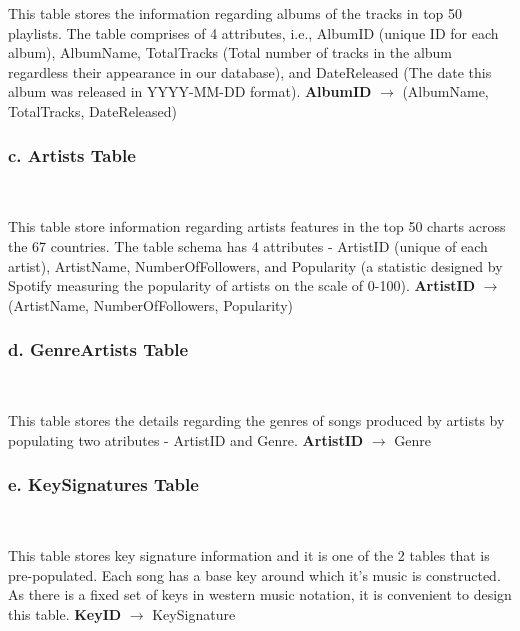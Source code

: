 \documentclass[conference]{IEEEtran}
\begin{document}
This table stores the information regarding albums of the tracks in top 50 playlists. The table comprises of 4 attributes, i.e., AlbumID (unique ID for each album), AlbumName, TotalTracks (Total number of tracks in the album regardless their appearance in our database), and DateReleased (The date this album was released in YYYY-MM-DD format). \linebreak \linebreak
\textbf{AlbumID} $\to$ (AlbumName, TotalTracks, DateReleased) \linebreak

\subsubsection*{c. \textbf{Artists} Table} \

This table store information regarding artists features in the top 50 charts across the 67 countries. The table schema has 4 attributes - ArtistID (unique of each artist), ArtistName, NumberOfFollowers, and Popularity (a statistic designed by Spotify measuring the popularity of artists on the scale of 0-100). \linebreak \linebreak
\textbf{ArtistID} $\to$ (ArtistName, NumberOfFollowers, Popularity) \linebreak

\subsubsection*{d. \textbf{GenreArtists} Table} \

This table stores the details regarding the genres of songs produced by artists by populating two atributes - ArtistID and Genre. \linebreak \linebreak
\textbf{ArtistID} $\to$ Genre \linebreak


\subsubsection*{e. \textbf{KeySignatures} Table} \

This table stores key signature information and it is one of the 2 tables that is pre-populated. Each song has a base key around which it's music is constructed. As there is a fixed set of keys in western music notation, it is convenient to design this table. \linebreak \linebreak
\textbf{KeyID} $\to$ KeySignature \linebreak
\end{document}

